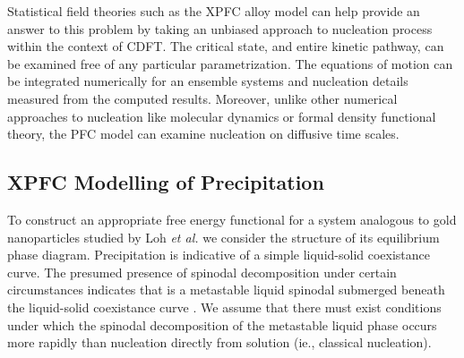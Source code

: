 \documentclass[showkeys, prb, reprint]{revtex4-1}
\begin{document}

Statistical field theories such as the XPFC alloy model can help provide an
answer to this problem by taking an unbiased approach to nucleation process
within the context of CDFT.  The critical state, and entire kinetic pathway,
can be examined free of any particular parametrization. The equations of motion
can be integrated numerically for an ensemble systems and nucleation details
measured from the computed results.  Moreover, unlike other numerical
approaches to nucleation like molecular dynamics or formal density functional
theory, the PFC model can examine nucleation on diffusive time scales.

\subsection{XPFC Modelling of Precipitation} %


To construct an appropriate free energy functional for a system analogous to
gold nanoparticles studied by Loh \textit{et al.} \cite{LOH17} we consider the
structure of its equilibrium phase diagram. Precipitation is indicative of a
simple liquid-solid coexistance curve. The presumed presence of spinodal
decomposition under certain circumstances indicates that is a metastable liquid
spinodal submerged beneath the liquid-solid coexistance curve \cite{DAVEY13}.
We assume that there must exist conditions under which the spinodal
decomposition of the metastable liquid phase occurs more rapidly than
nucleation directly from solution (ie., classical nucleation).

\end{document}
